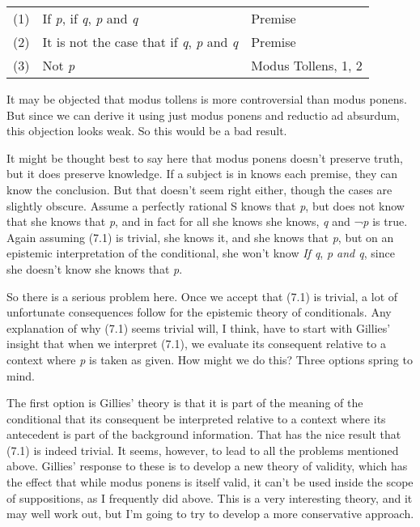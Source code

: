 \documentclass[
  11pt,
  letterpaper,
  DIV=11,
  numbers=noendperiod,
  twoside]{scrartcl}
\begin{document}
\begin{longtable}[]{@{}
  >{\raggedleft\arraybackslash}p{}
  >{\raggedright\arraybackslash}p{}
  >{\raggedright\arraybackslash}p{}@{}}
\toprule\noalign{}
\endhead
\bottomrule\noalign{}
\endlastfoot
(1) & If \emph{p}, if \emph{q}, \emph{p} and \emph{q} & Premise \\
(2) & It is not the case that if \emph{q}, \emph{p} and \emph{q} &
Premise \\
(3) & Not \emph{p} & Modus Tollens, 1, 2 \\
\end{longtable}

It may be objected that modus tollens is more controversial than modus
ponens. But since we can derive it using just modus ponens and reductio
ad absurdum, this objection looks weak. So this would be a bad result.

It might be thought best to say here that modus ponens doesn't preserve
truth, but it does preserve knowledge. If a subject is in knows each
premise, they can know the conclusion. But that doesn't seem right
either, though the cases are slightly obscure. Assume a perfectly
rational S knows that \emph{p}, but does not know that she knows that
\emph{p}, and in fact for all she knows she knows, \emph{q} and
¬\emph{p} is true. Again assuming (7.1) is trivial, she knows it, and
she knows that \emph{p}, but on an epistemic interpretation of the
conditional, she won't know \emph{If q}, \emph{p and q}, since she
doesn't know she knows that \emph{p}.

So there is a serious problem here. Once we accept that (7.1) is
trivial, a lot of unfortunate consequences follow for the epistemic
theory of conditionals. Any explanation of why (7.1) seems trivial will,
I think, have to start with Gillies' insight that when we interpret
(7.1), we evaluate its consequent relative to a context where \emph{p}
is taken as given. How might we do this? Three options spring to mind.

The first option is Gillies' theory is that it is part of the meaning of
the conditional that its consequent be interpreted relative to a context
where its antecedent is part of the background information. That has the
nice result that (7.1) is indeed trivial. It seems, however, to lead to
all the problems mentioned above. Gillies' response to these is to
develop a new theory of validity, which has the effect that while modus
ponens is itself valid, it can't be used inside the scope of
suppositions, as I frequently did above. This is a very interesting
theory, and it may well work out, but I'm going to try to develop a more
conservative approach.
\end{document}
